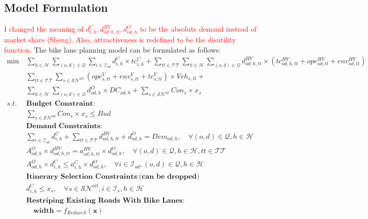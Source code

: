 \documentclass[trsc,nonblindrev]{informs3noheader}
\newcommand{\hl}[1]{\textcolor{red}{#1}}
\begin{document}
\subsection{Model Formulation}
\hl{I changed the meaning of $d_{i,h}^{C}, d_{od,h,tt}^{HV}, d_{od,h}^{O}$ to be the absolute demand instead of market share (Sheng). Also, attractiveness is redefined to be the disutility function.} 
The bike lane planning model can be formulated as follows:
\begin{align}
      \min\ &\sum_{h\in \mathcal{H}}\sum_{(o,d)\in\mathcal{Q}}\sum_{i\in \mathcal{I}_{od}} d_{i,h}^{C}\times tc_{i,h}^{C} + \sum_{tt \in \mathcal{TT}}\sum_{h\in \mathcal{H}}\sum_{(o,d)\in \mathcal{Q}} d_{od,h,tt}^{HV}\times (tc^{HV}_{od,h,tt}+ope^{HV}_{od,tt}+env^{HV}_{od,tt}) \nonumber\\
      & \sum_{tt \in \mathcal{TT}} \sum_{s\in \mathcal{SN}^{all}}(ope^V_{s,tt}+env^V_{s,tt}+tc^V_{s,tt})\times Veh_{s,tt}+ \nonumber\\
      &\sum_{h\in \mathcal{H}}\sum_{(o,d)\in \mathcal{Q}}  d_{od,h}^{O}\times DC_{od,h} + \sum_{s\in \mathcal{SN}^{all}} Con_s\times x_s \label{obj}\\ 
    s.t.\ & \textbf{Budget Constraint:} \nonumber \\ 
    & \sum_{s\in \mathcal{SN}^{all}} Con_s\times x_s \leq Bud  \label{BudgetCons}\\
              & \textbf{Demand Constraints:} \nonumber \\
&\sum_{i\in \mathcal{I}_{od}} d_{i,h}^{C}+\sum_{tt \in \mathcal{TT}}d_{od,h,tt}^{HV}+d_{od,h}^O = Dem_{od,h}, \text{~~~}\forall (o,d)\in  \mathcal{Q}, h\in  \mathcal{H} \label{Marketshare}\\
               & A_{od,h}^O \times d_{od,h,tt}^{HV}= a_{od,h,tt}^{HV}\times d_{od,h}^O,\text{~~~}\forall (o,d)\in  \mathcal{Q}, h\in  \mathcal{H}, tt\in \mathcal{TT}\label{demandsplitting2}\\
& A_{od,h}^O\times  d_{i,h}^{C}\leq a_{i,h}^{C}\times d_{od,h}^O,\text{~~~}\forall i\in  \mathcal{I}_{od}, {(o,d)}\in \mathcal{Q}, h\in  \mathcal{H} \label{demandsplitting1}\\
& \textbf{Itinerary Selection Constraints:(can be dropped)} \nonumber \\
& d_{i,h}^{C}\leq x_s,\text{~~~}\forall s\in \mathcal{SN}^{all}, i\in  \mathcal{I}_{s}, h\in  \mathcal{H} \label{Itineraryselection}\\
& \textbf{Restriping Existing Roads With Bike Lanes:} \nonumber \\
& \quad\mathbf{width}=f_{ReduceS}(\mathbf{x})

\end{align}
\end{document}
